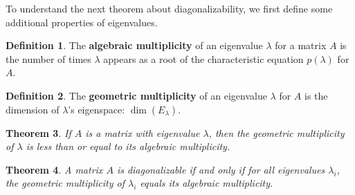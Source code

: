 \documentclass[11pt]{amsart}
\newtheorem{theorem}{Theorem}[section]
\theoremstyle{definition}
\newtheorem{definition}[theorem]{Definition}
\begin{document}
To understand the next theorem about diagonalizability, we first define some additional properties of eigenvalues.
\begin{definition}
	The \textbf{algebraic multiplicity} of an eigenvalue $\lambda$ for a matrix $A$ is the number of times $\lambda$ appears as a root of the
	characteristic equation $p(\lambda)$ for $A$.
\end{definition}
\begin{definition}
	The \textbf{geometric multiplicity} of an eigenvalue $\lambda$ for $A$ is the dimension of $\lambda$'s eigenspace: $\dim(E_\lambda)$.
\end{definition}
\begin{theorem}
	If $A$ is a matrix with eigenvalue $\lambda$, then the geometric multiplicity of $\lambda$ is less than or equal to its algebraic multiplicity.
\end{theorem}
\begin{theorem}
	A matrix $A$ is diagonalizable if and only if for all eigenvalues $\lambda_i$, the geometric multiplicity of $\lambda_i$ equals its
	algebraic multiplicity.
\end{theorem}

\newpage
\end{document}
